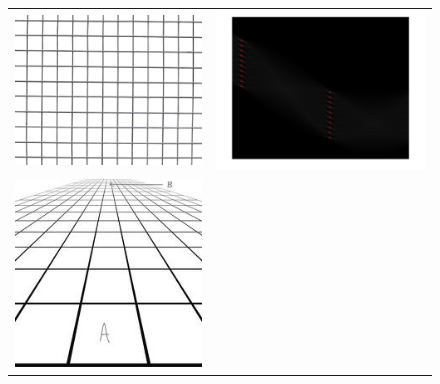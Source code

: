 \begin{figure}[h]
\begin{center}
\begin{tabular}{cc}
\includegraphics[scale=0.18]{fig/grillage.jpg} &
\includegraphics[scale=0.2]{fig/grillagehough.png}
\\
\includegraphics[scale=0.4]{fig/perspective.jpg}

\end{tabular}
\end{center}
\end{figure}
